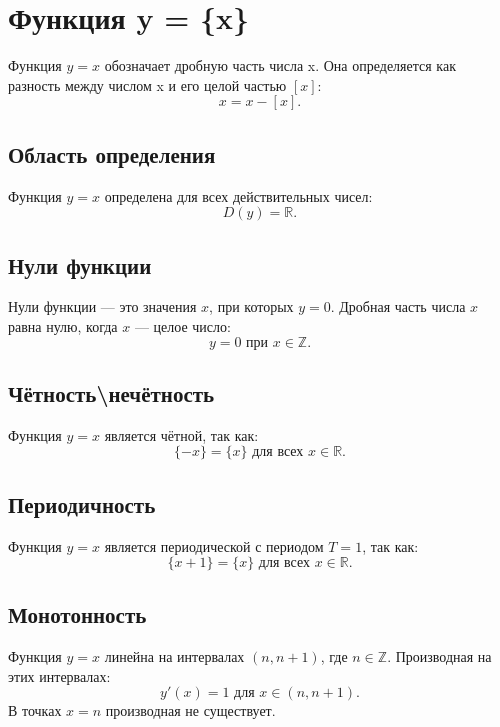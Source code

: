 \begin{flushleft}
		\begin{center}
		\end{center}		 
		 
		\section{Функция y = \{x\}}
		Функция $y={x}$ обозначает дробную часть числа  x. Она определяется как разность между числом x и его целой частью $[x]$:
		\[{x}=x−[x].\]
		 
		\subsection*{Область определения}
		Функция $y={x}$ определена для всех действительных чисел:
		\[D(y)=\mathds{R}.\]
		 
		\subsection*{Нули функции}
		Нули функции — это значения $x$, при которых $y=0$. Дробная часть числа $x$ равна нулю, когда $x$ --- целое число:
		\[y=0 \text{ при } x\in\mathds{Z}.\]
		 
		\subsection*{Чётность\textbackslash нечётность}
		Функция $y={x}$ является чётной, так как:
		\[\{−x\}=\{x\}\text{ для всех }x\in\mathds{R}.\]
		 	 
		\subsection*{Периодичность}
		Функция $y={x}$ является периодической с периодом $T=1$, так как:
		\[\{x+1\}=\{x\}\text{ для всех } x\in\mathds{R}.\]
		 
		\subsection*{Монотонность}
		Функция $y={x}$ линейна на интервалах $(n,n+1)$, где $n\in\mathds{Z}$. Производная на этих интервалах:
		\[y'(x)=1 \text{ для }x\in(n,n+1).\]
		В точках $x=n$ производная не существует.
		 

\end{flushleft}
